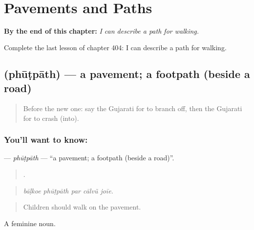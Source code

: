 
\chapter{Pavements and Paths}
\label{ch:gu-pavements-and-paths}

\begin{chapteropening}
\textbf{By the end of this chapter:} \emph{I can describe a path for walking.}

Complete the last lesson of chapter 404: I can describe a path for walking.
\end{chapteropening}

\section[\texorpdfstring{\gu{ફૂટપાથ} (phūṭpāth)}{ફૂટપાથ (phūṭpāth)}]{ (phūṭpāth) — a pavement; a footpath (beside a road)}

\label{lesson:GU-C404-phutpath}



\begin{quote}
Before the new one: say the Gujarati for to branch off, then the Gujarati for to crash (into).
\end{quote}

\subsection*{You'll want to know: }
\textbf{} — \emph{phūṭpāth} — \textquotedblleft{}a pavement; a footpath (beside a road)\textquotedblright{}.

\begin{quote}
    .
\end{quote}

\begin{quote}
\emph{bāḷkoe phūṭpāth par cālvũ joīe.}
\end{quote}

\begin{quote}
Children should walk on the pavement.
\end{quote}

A feminine noun.

